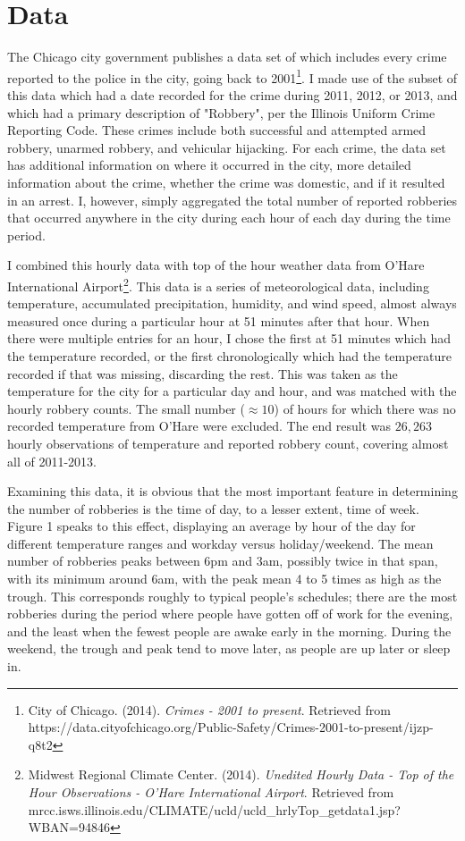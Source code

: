 \documentclass[11pt]{article}
\theoremstyle{definition}
\begin{document}
\section{Data} 
The Chicago city government publishes a data set of which includes every crime reported to the police in the city, going back to 2001\footnote{City of Chicago. (2014). \textit{ Crimes - 2001 to present}. Retrieved from https://data.cityofchicago.org/Public-Safety/Crimes-2001-to-present/ijzp-q8t2}. I made use of the subset of this data which had a date recorded for the crime during 2011, 2012, or 2013, and which had a primary description of "Robbery", per the Illinois Uniform Crime Reporting Code. These crimes include both successful and attempted armed robbery, unarmed robbery, and vehicular hijacking. For each crime, the data set has additional information on where it occurred in the city, more detailed information about the crime, whether the crime was domestic, and if it resulted in an arrest. I, however, simply aggregated the total number of reported robberies that occurred anywhere in the city during each hour of each day during the time period. \par
I combined this hourly data with top of the hour weather data from O'Hare International Airport\footnote{Midwest Regional Climate Center. (2014). \textit{Unedited Hourly Data - Top of the Hour Observations - O'Hare International Airport}. Retrieved from mrcc.isws.illinois.edu/CLIMATE/ucld/ucld\_hrlyTop\_getdata1.jsp?WBAN=94846}. This data is a series of meteorological data, including temperature, accumulated precipitation, humidity, and wind speed, almost always measured once during a particular hour at 51 minutes after that hour. When there were multiple entries for an hour, I chose the first at 51 minutes which had the temperature recorded, or the first chronologically which had the temperature recorded if that was missing, discarding the rest. This was taken as the temperature for the city for a particular day and hour, and was matched with the hourly robbery counts. The small number ($\approx 10$) of hours for which there was no recorded temperature from O'Hare were excluded. The end result was $26,263$ hourly observations of temperature and reported robbery count, covering almost all of 2011-2013. \par
Examining this data, it is obvious that the most important feature in determining the number of robberies is the time of day, to a lesser extent, time of week. Figure 1 speaks to this effect, displaying an average by hour of the day for different temperature ranges and workday versus holiday/weekend. The mean number of robberies peaks between 6pm and 3am, possibly twice in that span, with its minimum around 6am, with the peak mean 4 to 5 times as high as the trough. This corresponds roughly to typical people's schedules; there are the most robberies during the period where people have gotten off of work for the evening, and the least when the fewest people are awake early in the morning. During the weekend, the trough and peak tend to move later, as people are up later or sleep in. \par
\end{document}
